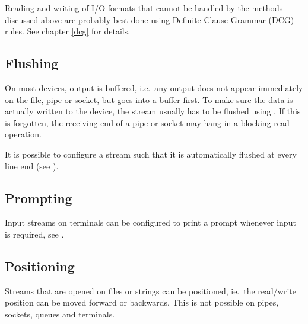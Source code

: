 Reading and writing of I/O formats that cannot be handled by the methods
discussed above are probably best done using Definite Clause Grammar
(DCG) rules. See chapter \ref{dcg} for details.


\subsection{Flushing}
On most devices, output is buffered, i.e.\ any output does not appear
immediately on the file, pipe or socket, but goes into a buffer first.
To make sure the data is actually written to the device, the stream
usually has to be flushed using
.
If this is forgotten, the receiving end of a pipe or socket may hang
in a blocking read operation.

It is possible to configure a stream such that it is automatically
flushed at every line end (see 
).


\subsection{Prompting}
Input streams on terminals can be configured to print a prompt
whenever input is required, see 
.


\subsection{Positioning}
Streams that are opened on files or strings can be positioned,
ie.\ the read/write position can be moved forward or backwards.
This is not possible on pipes, sockets, queues and terminals.

